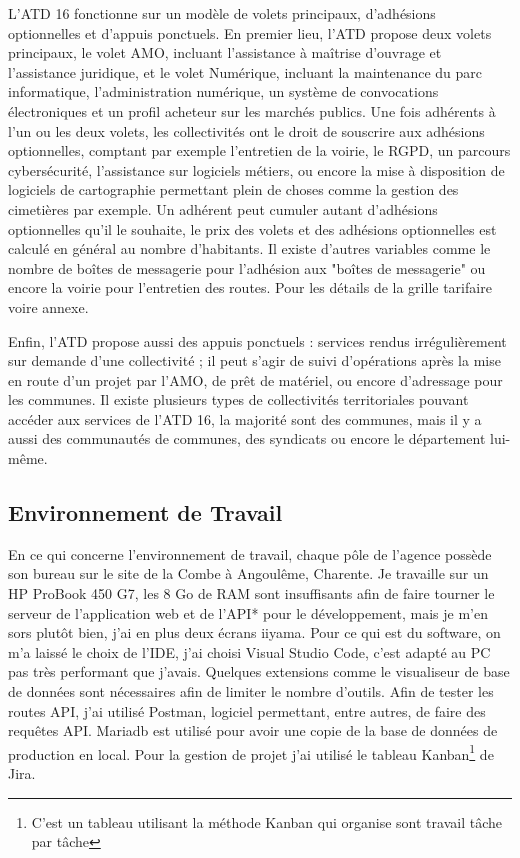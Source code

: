 \documentclass[a4paper,12pt]{report}
\begin{document}
L'ATD 16 fonctionne sur un modèle de volets principaux, d'adhésions optionnelles et d'appuis ponctuels. En premier lieu, l'ATD propose deux volets principaux, le volet AMO, incluant l'assistance à maîtrise d'ouvrage et l'assistance juridique, et le volet Numérique, incluant la maintenance du parc informatique, l'administration numérique, un système de convocations électroniques et un profil acheteur sur les marchés publics. Une fois adhérents à l'un ou les deux volets, les collectivités ont le droit de souscrire aux adhésions optionnelles, comptant par exemple l'entretien de la voirie, le RGPD, un parcours cybersécurité, l'assistance sur logiciels métiers, ou encore la mise à disposition de logiciels de cartographie permettant plein de choses comme la gestion des cimetières par exemple. Un adhérent peut cumuler autant d'adhésions optionnelles qu'il le souhaite, le prix des volets et des adhésions optionnelles est calculé en général au nombre d'habitants. Il existe d'autres variables comme le nombre de boîtes de messagerie pour l'adhésion aux "boîtes de messagerie" ou encore la voirie pour l'entretien des routes. Pour les détails de la grille tarifaire voire annexe.

Enfin, l'ATD propose aussi des appuis ponctuels : services rendus irrégulièrement sur demande d'une collectivité ; il peut s'agir de suivi d'opérations après la mise en route d'un projet par l'AMO, de prêt de matériel, ou encore d'adressage pour les communes. Il existe plusieurs types de collectivités territoriales pouvant accéder aux services de l'ATD 16, la majorité sont des communes, mais il y a aussi des communautés de communes, des syndicats ou encore le département lui-même.



\subsection{Environnement de Travail}

En ce qui concerne l'environnement de travail, chaque pôle de l'agence possède son bureau sur le site de la Combe à Angoulême, Charente. Je travaille sur un HP ProBook 450 G7, les 8 Go de RAM sont insuffisants afin de faire tourner le serveur de l'application web et de l'API* pour le développement, mais je m'en sors plutôt bien, j'ai en plus deux écrans iiyama. Pour ce qui est du software, on m'a laissé le choix de l'IDE, j'ai choisi Visual Studio Code, c'est adapté au PC pas très performant que j'avais. Quelques extensions comme le visualiseur de base de données sont nécessaires afin de limiter le nombre d'outils. Afin de tester les routes API, j'ai utilisé Postman, logiciel permettant, entre autres, de faire des requêtes API. Mariadb est utilisé pour avoir une copie de la base de données de production en local. Pour la gestion de projet j'ai utilisé le tableau Kanban\footnote{C'est un tableau utilisant la méthode Kanban qui organise sont travail tâche par tâche} de Jira.
\end{document}
